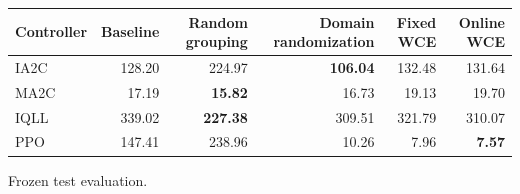 \begin{tabular}{lrrrrr}
\hline
Controller & Baseline & Random grouping & Domain randomization & Fixed WCE & Online WCE \\
\hline
IA2C & 128.20 & 224.97 & \textbf{106.04} & 132.48 & 131.64 \\
MA2C & 17.19 & \textbf{15.82} & 16.73 & 19.13 & 19.70 \\
IQLL & 339.02 & \textbf{227.38} & 309.51 & 321.79 & 310.07 \\
PPO & 147.41 & 238.96 & 10.26 & 7.96 & \textbf{7.57} \\
\hline
\end{tabular}
Frozen test evaluation.
